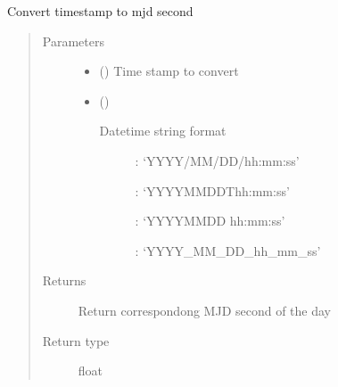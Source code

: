 \documentclass[letterpaper,10pt,english]{sphinxmanual}
\begin{document}

\begin{fulllineitems}
\label{\detokenize{paircars:paircars.basic_func.timestamp_to_mjdsec}}
\sphinxAtStartPar
Convert timestamp to mjd second
\begin{quote}\begin{description}
\item[{Parameters}] \leavevmode\begin{itemize}
\item {} 
\sphinxAtStartPar
{} () \textendash{} Time stamp to convert

\item {} 
\sphinxAtStartPar
{} () \textendash{} \begin{description}
\item[{Datetime string format}] \leavevmode
{}: ‘YYYY/MM/DD/hh:mm:ss’

: ‘YYYY\sphinxhyphen{}MM\sphinxhyphen{}DDThh:mm:ss’

: ‘YYYY\sphinxhyphen{}MM\sphinxhyphen{}DD hh:mm:ss’

: ‘YYYY\_MM\_DD\_hh\_mm\_ss’

\end{description}


\end{itemize}

\item[{Returns}] \leavevmode
\sphinxAtStartPar
Return correspondong MJD second of the day

\item[{Return type}] \leavevmode
\sphinxAtStartPar
float

\end{description}\end{quote}

\end{fulllineitems}

\end{document}
